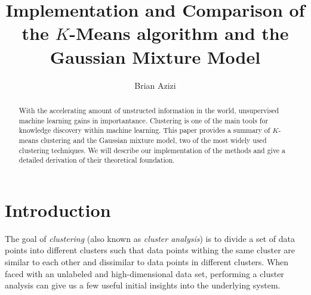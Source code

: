 \documentclass[final,3p,times,twocolumn]{elsarticle}
\begin{document}
\begin{frontmatter}



\title{Implementation and Comparison of the $K$-Means algorithm and the Gaussian Mixture Model}


\author{Brian Azizi}

\address{Cavendish Laboratory, Department of Physics, J J Thomson
  Avenue, Cambridge. CB3 0HE}

\begin{abstract}
With the accelerating amount of unstructed information in the world, unsupervised machine learning gains in importantance.
Clustering is one of the main tools for knowledge discovery within machine learning.
This paper provides a summary of $K$-means clustering and the Gaussian mixture model, two of the most widely used clustering techniques.
We will describe our implementation of the methods and give a detailed derivation of their theoretical foundation.
\end{abstract}

\end{frontmatter}


\section{Introduction}
\label{sect:Intro}
The goal of \emph{clustering} (also known as \emph{cluster analysis}) is to divide a set of data points into different clusters such that data points withing the same cluster are similar to each other and dissimilar to data points in different clusters. 
When faced with an unlabeled and high-dimensional data set, performing a cluster analysis can give us a few useful initial insights into the underlying system.
\end{document}
